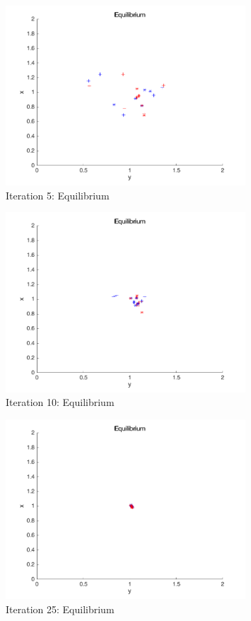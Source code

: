 \begin{figure}[H]
\begin{center}
\includegraphics[width=0.8\textwidth]{img/mdme/equilibrium5}
\caption{Iteration 5: Equilibrium}
\end{center}
\end{figure}
\begin{figure}[H]
\begin{center}
\includegraphics[width=0.8\textwidth]{img/mdme/equilibrium10}
\caption{Iteration 10: Equilibrium}
\end{center}
\end{figure}
\begin{figure}[H]
\begin{center}
\includegraphics[width=0.8\textwidth]{img/mdme/equilibrium25}
\caption{Iteration 25: Equilibrium}
\end{center}
\end{figure}
